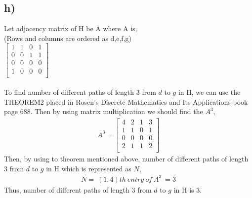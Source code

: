 \documentclass[11pt]{article}
\begin{document}
\subsection*{h)}
Let adjacency matrix of H be A where A is, \\
(Rows and columns are ordered as d,e,f,g) \\
$
\begin{bmatrix}
1 & 1 & 0 & 1 \\
0 & 0 & 1 & 1 \\
0 & 0 & 0 & 0 \\
1 & 0 & 0 & 0 \\
\end{bmatrix}
$\\ \\
To find number of different paths of length 3 from $d$ to $g$ in H, we can use the THEOREM2 placed in Rosen's Discrete Mathematics and Its Applications book page 688. Then by using matrix multiplication we should find the $A^{3}$,
\begin{equation*}
\begin{split}
A^{3} = \begin{bmatrix}
4 & 2 & 1 & 3 \\
1 & 1 & 0 & 1 \\
0 & 0 & 0 & 0 \\
2 & 1 & 1 & 2 \\
\end{bmatrix}
\end{split}
\end{equation*}
Then, by using to theorem mentioned above, number of different paths of length 3 from $d$ to $g$ in H which is represented as $N$,
\begin{equation*}
\begin{split}
N = \ (1,4)th \ entry \ of \ A^{3} \ = 3
\end{split}
\end{equation*}
Thus, number of different paths of length 3 from $d$ to $g$ in H is 3.
\end{document}
